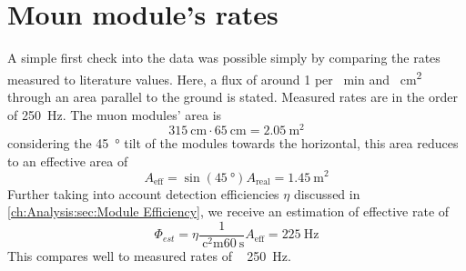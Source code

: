   \section{Moun module's rates}
  \label{ch:Analysis:sec:Muon module's rates}
  A simple first check into the data was possible simply by comparing the rates measured to literature values. Here, a flux of around 1 per \SI{}{\minute} and \SI{}{\square\centi\meter} through an area parallel to the ground is stated. Measured rates are in the order of \SI{250}{\hertz}. The muon modules' area is
  \begin{equation}
  	\SI{315}{\centi\meter} \cdot \SI{65}{\centi\meter} = \SI{2.05}{\square\meter}
  \end{equation}
  considering the \SI{45}{\degree} tilt of the modules towards the horizontal, this area reduces to an effective area of 
  \begin{equation}
  	A_{\mathrm{eff}} = \sin{\left(\SI{45}{\degree}\right)} A_{\mathrm{real}} = \SI{1.45}{\square\meter}
  \end{equation}
  Further taking into account detection efficiencies $\eta$ discussed in \ref{ch:Analysis:sec:Module Efficiency}, we receive an estimation of effective rate of
  \begin{equation}
  	\Phi_{est} = \eta \frac{1}{\SI{}{\square\centi\meter}\SI{60}{\second}}A_{\mathrm{eff}} = \SI{225}{\hertz}
  \end{equation}
  This compares well to measured rates of  ~ \SI{250}{\hertz}.
  
